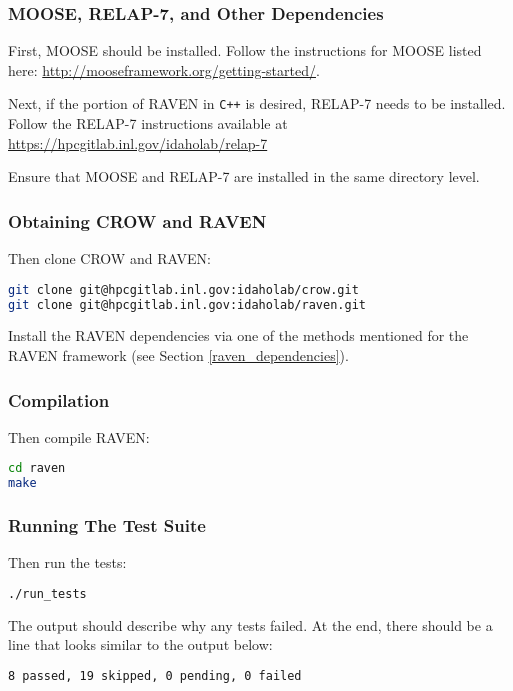 \subsubsection{MOOSE, RELAP-7, and Other Dependencies}
First, MOOSE should be installed.  Follow the instructions for MOOSE listed
here: \url{http://mooseframework.org/getting-started/}.

Next, if the portion of RAVEN in \texttt{C++} is desired, RELAP-7 needs to be installed.
%
Follow the RELAP-7 instructions available at \url{https://hpcgitlab.inl.gov/idaholab/relap-7}

Ensure that MOOSE and RELAP-7 are installed in the same directory level.

\subsubsection{Obtaining CROW and RAVEN}
Then clone CROW and RAVEN:

\begin{lstlisting}[language=bash]
git clone git@hpcgitlab.inl.gov:idaholab/crow.git
git clone git@hpcgitlab.inl.gov:idaholab/raven.git
\end{lstlisting}

Install the RAVEN dependencies via one of the methods mentioned for
the RAVEN framework (see Section \ref{raven_dependencies}).

\subsubsection{Compilation}

Then compile RAVEN:

\begin{lstlisting}[language=bash]
cd raven
make
\end{lstlisting}

\subsubsection{Running The Test Suite}
Then run the tests:

\begin{lstlisting}[language=bash]
./run_tests
\end{lstlisting}

The output should describe why any tests failed.
%
At the end, there should be a line that looks similar to the output below:
\begin{lstlisting}[language=bash]
8 passed, 19 skipped, 0 pending, 0 failed
\end{lstlisting}
